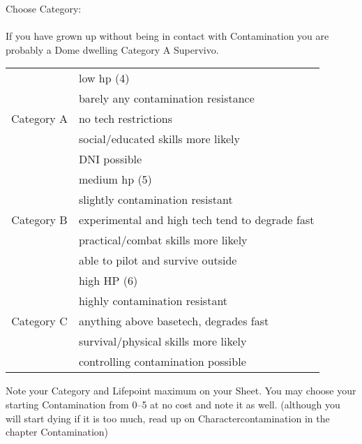 \documentclass{book}
\begin{document}
    Choose Category:\\\\
    If you have grown up without being in contact with Contamination you are probably a Dome dwelling Category A Supervivo. \\
    \begin{tabular}{c|l}
        & low hp (4)\\
        & barely any contamination resistance\\
        Category A     & no tech restrictions\\
        & social/educated skills more likely\\
        & DNI possible\\\hline
        & medium hp (5)\\
        & slightly contamination resistant\\
        Category B    & experimental and high tech tend to degrade fast\\
        & practical/combat skills more likely\\
        & able to pilot and survive outside\\\hline
        & high HP (6) \\
        & highly contamination resistant \\
        Category C & anything above basetech, degrades fast\\
        & survival/physical skills more likely\\
        & controlling contamination possible
    \end{tabular}\newline




    Note your Category and Lifepoint maximum on your Sheet.
    You may choose your starting Contamination from 0--5 at no cost and note
    it as well. (although you will start dying if it is too much, read up on Charactercontamination in the chapter Contamination)\\
\end{document}
